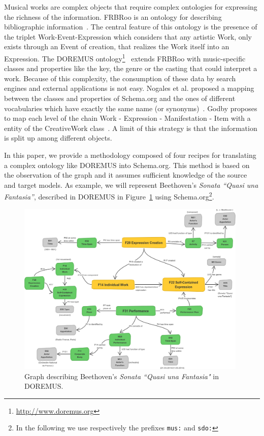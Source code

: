 \documentclass{llncs}
\begin{document}
Musical works are complex objects that require complex ontologies for expressing the richness of the information. FRBRoo is an ontology for describing bibliographic information~\cite{doerr2008frbroo}. The central feature of this ontology is the presence of the triplet Work-Event-Expression which considers that any artistic Work, only exists through an Event of creation, that realizes the Work itself into an Expression. The DOREMUS ontology\footnote{\url{http://www.doremus.org}}~\cite{achichidoremus} extends FRBRoo with music-specific classes and properties like the key, the genre or the casting that could interpret a work. Because of this complexity, the consumption of these data by search engines and external applications is not easy.
Nogales et al. proposed a mapping between the classes and properties of Schema.org and the ones of different vocabularies which have exactly the same name (or synonyms)~\cite{nogales2016linking}. Godby proposes to map each level of the chain Work - Expression - Manifestation - Item with a entity of the CreativeWork class~\cite{godby2013relationship}. A limit of this strategy is that the information is split up among different objects.

In this paper, we provide a methodology composed of four recipes for translating a complex ontology like DOREMUS into Schema.org. This method is based on the observation of the graph and it assumes sufficient knowledge of the source and target models. As example, we will represent Beethoven's \textit{Sonata ``Quasi una Fantasia''}, described in DOREMUS in Figure~\ref{fig:beet-doremus} using Schema.org\footnote{In the following we use respectively the prefixes \texttt{mus:} and \texttt{sdo:}}.

\begin{figure}
 \includegraphics[width=11cm]{img/Beethoven-Doremus.png}
 \centering
 \caption{Graph describing Beethoven's \textit{Sonata ``Quasi una Fantasia"} in DOREMUS.}
 \label{fig:beet-doremus}
\end{figure}
\end{document}
